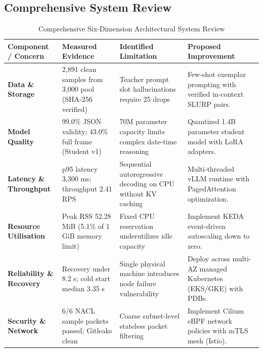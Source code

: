 \documentclass[10pt,a4paper]{article}
\begin{document}
\subsection{Comprehensive System Review}
\begin{table}[h!]
\centering
\small
\caption{Comprehensive Six-Dimension Architectural System Review}
\vspace{0.1cm}
\begin{tabularx}{\textwidth}{p{3.0cm}p{3.5cm}p{4.2cm}X}
\toprule
\textbf{Component / Concern} & \textbf{Measured Evidence} & \textbf{Identified Limitation} & \textbf{Proposed Improvement} \\
\midrule
\textbf{Data \& Storage} & 2,891 clean samples from 3,000 pool (SHA-256 verified) & Teacher prompt slot hallucinations require 25 drops & Few-shot exemplar prompting with verified in-context SLURP pairs. \\
\addlinespace[3pt]
\textbf{Model Quality} & 99.0\% JSON validity; 43.0\% full frame (Student v1) & 70M parameter capacity limits complex date-time reasoning & Quantized 1.4B parameter student model with LoRA adapters. \\
\addlinespace[3pt]
\textbf{Latency \& Throughput} & p95 latency 3,300 ms; throughput 2.41 RPS & Sequential autoregressive decoding on CPU without KV caching & Multi-threaded vLLM runtime with PagedAttention optimization. \\
\addlinespace[3pt]
\textbf{Resource Utilisation} & Peak RSS 52.28 MiB (5.1\% of 1 GiB memory limit) & Fixed CPU reservation underutilizes idle capacity & Implement KEDA event-driven autoscaling down to zero. \\
\addlinespace[3pt]
\textbf{Reliability \& Recovery} & Recovery under 8.2 s; cold start median 3.35 s & Single physical machine introduces node failure vulnerability & Deploy across multi-AZ managed Kubernetes (EKS/GKE) with PDBs. \\
\addlinespace[3pt]
\textbf{Security \& Network} & 6/6 NACL sample packets passed; Gitleaks clean & Coarse subnet-level stateless packet filtering & Implement Cilium eBPF network policies with mTLS mesh (Istio). \\
\bottomrule
\end{tabularx}
\end{table}
\end{document}
